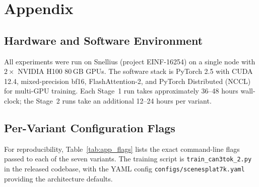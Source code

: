 \chapter{Appendix}
\label{chap:appendix}

\section{Hardware and Software Environment}
\label{app:env}

All experiments were run on Snellius (project EINF-16254) on a single node with $2 \times $ NVIDIA H100 80\,GB GPUs. The software stack is PyTorch 2.5 with CUDA 12.4, mixed-precision bf16, FlashAttention-2, and PyTorch Distributed (NCCL) for multi-GPU training. Each Stage~1 run takes approximately 36--48 hours wall-clock; the Stage~2 runs take an additional 12--24 hours per variant.

\section{Per-Variant Configuration Flags}
\label{app:flags}

For reproducibility, Table~\ref{tab:app_flags} lists the exact command-line flags passed to each of the seven variants. The training script is \texttt{train\_can3tok\_2.py} in the released codebase, with the YAML config \texttt{configs/scenesplat7k.yaml} providing the architecture defaults.

